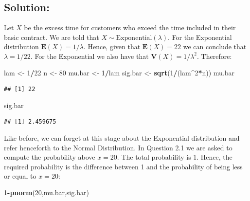 \documentclass[
]{krantz}
\makeatletter
\newenvironment{Shaded}{\begin{snugshade}}{\end{snugshade}}
\newcommand{\DecValTok}[1]{\textcolor[rgb]{0.00,0.00,0.81}{#1}}
\newcommand{\KeywordTok}[1]{\textcolor[rgb]{0.13,0.29,0.53}{\textbf{#1}}}
\newcommand{\NormalTok}[1]{#1}
\newcommand{\OperatorTok}[1]{\textcolor[rgb]{0.81,0.36,0.00}{\textbf{#1}}}
\newcommand{\StringTok}[1]{\textcolor[rgb]{0.31,0.60,0.02}{#1}}
\newcommand{\Expec}{\mathbf{E}}
\newcommand{\Var}{\mathbf{V}}
\newenvironment{kframe}{%
\medskip{}
\setlength{\fboxsep}{.8em}
 \def\at@end@of@kframe{}%
 \ifinner\ifhmode%
  \def\at@end@of@kframe{\end{minipage}}%
  \begin{minipage}{\columnwidth}%
 \fi\fi%
 \def\FrameCommand##1{\hskip\@totalleftmargin \hskip-\fboxsep
 \colorbox{shadecolor}{##1}\hskip-\fboxsep
     \hskip-\linewidth \hskip-\@totalleftmargin \hskip\columnwidth}%
 \MakeFramed {\advance\hsize-\width
   \@totalleftmargin\z@ \linewidth\hsize
   \@setminipage}}%
 {\par\unskip\endMakeFramed%
 \at@end@of@kframe}
\renewenvironment{Shaded}{\begin{kframe}}{\end{kframe}}
\theoremstyle{definition}
\theoremstyle{definition}
\theoremstyle{definition}
\theoremstyle{remark}
\makeatother
\begin{document}
\hypertarget{solution-2}{%
\subsection*{Solution:}\label{solution-2}}


Let \(X\) be the excess time for customers who exceed the time included in
their basic contract. We are told that
\(X \sim \mathrm{Exponential}(\lambda)\). For the Exponential distribution
\(\Expec(X) = 1/\lambda\). Hence, given that \(\Expec(X) = 22\) we can
conclude that \(\lambda = 1/22\). For the Exponential we also have that
\(\Var(X) = 1/\lambda^2\). Therefore:

\begin{Shaded}
\begin{Highlighting}[]
\NormalTok{lam <-}\StringTok{ }\DecValTok{1}\OperatorTok{/}\DecValTok{22}
\NormalTok{n <-}\StringTok{ }\DecValTok{80}
\NormalTok{mu.bar <-}\StringTok{ }\DecValTok{1}\OperatorTok{/}\NormalTok{lam}
\NormalTok{sig.bar <-}\StringTok{ }\KeywordTok{sqrt}\NormalTok{(}\DecValTok{1}\OperatorTok{/}\NormalTok{(lam}\OperatorTok{^}\DecValTok{2}\OperatorTok{*}\NormalTok{n))}
\NormalTok{mu.bar}
\end{Highlighting}
\end{Shaded}

\begin{verbatim}
## [1] 22
\end{verbatim}

\begin{Shaded}
\begin{Highlighting}[]
\NormalTok{sig.bar}
\end{Highlighting}
\end{Shaded}

\begin{verbatim}
## [1] 2.459675
\end{verbatim}

Like before, we can forget at this stage about the Exponential
distribution and refer henceforth to the Normal Distribution. In
Question 2.1 we are asked to compute the probability above \(x=20\). The
total probability is 1. Hence, the required probability is the
difference between 1 and the probability of being less or equal to
\(x=20\):

\begin{Shaded}
\begin{Highlighting}[]
\DecValTok{1}\OperatorTok{-}\KeywordTok{pnorm}\NormalTok{(}\DecValTok{20}\NormalTok{,mu.bar,sig.bar)}
\end{Highlighting}
\end{Shaded}
\end{document}
